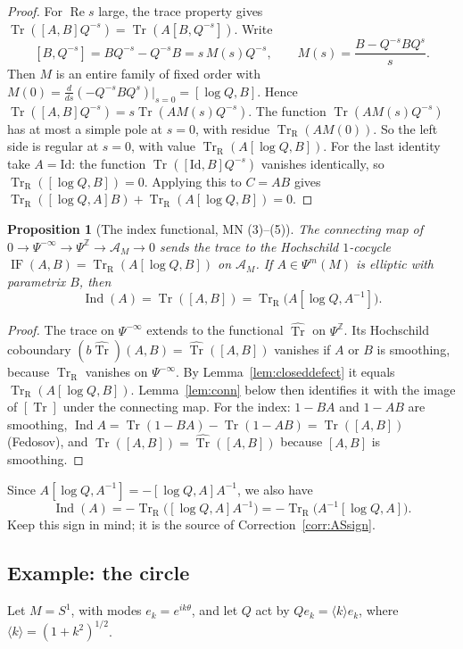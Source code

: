 \documentclass[11pt,oneside,reqno]{article}
\DeclareMathOperator{\Tr}{Tr}
\DeclareMathOperator{\Ind}{Ind}
\DeclareMathOperator{\IF}{IF}
\newcommand{\Z}{\mathbb Z}
\newcommand{\cA}{\mathcal A}
\newcommand{\TrR}{\Tr_{\mathrm R}}
\newcommand{\lQ}{\log Q}
\theoremstyle{plain}
\newtheorem{proposition}[theorem]{Proposition}
\theoremstyle{definition}
\theoremstyle{remark}
\begin{document}
\begin{proof}
For \(\operatorname{Re}s\) large, the trace property gives
\(\Tr([A,B]Q^{-s})=\Tr(A[B,Q^{-s}])\). Write
\[
 [B,Q^{-s}]=BQ^{-s}-Q^{-s}B=s\,M(s)Q^{-s},\qquad
 M(s)=\frac{B-Q^{-s}BQ^{s}}{s}.
\]
Then \(M\) is an entire family of fixed order with
\(M(0)=\frac{d}{ds}(-Q^{-s}BQ^s)|_{s=0}=[\lQ,B]\). Hence
\(\Tr([A,B]Q^{-s})=s\Tr(AM(s)Q^{-s})\). The function \(\Tr(AM(s)Q^{-s})\)
has at most a simple pole at \(s=0\), with residue \(\TrR(AM(0))\). So
the left side is regular at \(s=0\), with value \(\TrR(A[\lQ,B])\). For
the last identity take \(A=\mathrm{Id}\): the function
\(\Tr([\mathrm{Id},B]Q^{-s})\) vanishes identically, so
\(\TrR([\lQ,B])=0\). Applying this to \(C=AB\) gives
\(\TrR([\lQ,A]B)+\TrR(A[\lQ,B])=0\).
\end{proof}

\begin{proposition}[The index functional, MN (3)--(5)]\label{prop:closedindex}
The connecting map of \(0\to\Psi^{-\infty}\to\Psi^{\Z}\to\cA_M\to0\) sends
the trace to the Hochschild \(1\)-cocycle
\(\IF(A,B)=\TrR(A[\lQ,B])\) on \(\cA_M\). If \(A\in\Psi^m(M)\) is elliptic
with parametrix \(B\), then
\[
 \Ind(A)=\Tr([A,B])=\TrR\bigl(A[\lQ,A^{-1}]\bigr).
\]
\end{proposition}

\begin{proof}
The trace on \(\Psi^{-\infty}\) extends to the functional \(\widehat{\Tr}\)
on \(\Psi^{\Z}\). Its Hochschild coboundary \((b\widehat{\Tr})(A,B)=
\widehat{\Tr}([A,B])\) vanishes if \(A\) or \(B\) is smoothing, because
\(\TrR\) vanishes on \(\Psi^{-\infty}\). By Lemma~\ref{lem:closeddefect}
it equals \(\TrR(A[\lQ,B])\). Lemma~\ref{lem:conn} below then identifies
it with the image of \([\Tr]\) under the connecting map. For the index:
\(1-BA\) and \(1-AB\) are smoothing, \(\Ind A=\Tr(1-BA)-\Tr(1-AB)=
\Tr([A,B])\) (Fedosov), and \(\Tr([A,B])=\widehat{\Tr}([A,B])\) because
\([A,B]\) is smoothing.
\end{proof}

Since \(A[\lQ,A^{-1}]=-[\lQ,A]A^{-1}\), we also have
\[
 \Ind(A)=-\TrR\bigl([\lQ,A]A^{-1}\bigr)=-\TrR\bigl(A^{-1}[\lQ,A]\bigr).
\]
Keep this sign in mind; it is the source of
Correction~\ref{corr:ASsign}.

\subsection{Example: the circle}\label{subsec:circle}
Let \(M=S^1\), with modes \(e_k=e^{ik\theta}\), and let \(Q\) act by
\(Qe_k=\langle k\rangle e_k\), where \(\langle k\rangle=(1+k^2)^{1/2}\).
\end{document}

